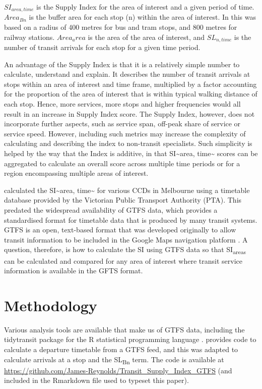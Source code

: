 \documentclass[numbered]{trbunofficial}
\begin{document}
\(SI_{area, time}\) is the Supply Index for the area of interest and a
given period of time. \(Area_{Bn}\) is the buffer area for each stop (n)
within the area of interest. In \citet{currie2007identifying} this was
based on a radius of 400 metres for bus and tram stops, and 800 metres
for railway stations. \(Area_area\) is the area of the area of interest,
and \(SL_{n,time}\) is the number of transit arrivals for each stop for
a given time period.

An advantage of the Supply Index is that it is a relatively simple
number to calculate, understand and explain. It describes the number of
transit arrivals at stops within an area of interest and time frame,
multiplied by a factor accounting for the proportion of the area of
interest that is within typical walking distance of each stop. Hence,
more services, more stops and higher frequencies would all result in an
increase in Supply Index score. The Supply Index, however, does not
incorporate further aspects, such as service span, off-peak share of
service or service speed. However, including such metrics may increase
the complexity of calculating and describing the index to non-transit
specialists. Such simplicity is helped by the way that the Index is
additive, in that SI\textasciitilde area, time\textasciitilde{} scores
can be aggregated to calculate an overall score across multiple time
periods or for a region encompassing multiple areas of interest.

\citet{currie2007identifying} calculated the SI\textasciitilde area,
time\textasciitilde{} for various CCDs in Melbourne using a timetable
database provided by the Victorian Public Transport Authority (PTA).
This predated the widespread availability of GTFS data, which provides a
standardised format for timetable data that is produced by many transit
systems. GTFS is an open, text-based format that was developed
originally to allow transit information to be included in the Google
Maps navigation platform \citep{GTFS}. A question, therefore, is how to
calculate the SI using GTFS data so that SI\textsubscript{areas} can be
calculated and compared for any area of interest where transit service
information is available in the GFTS format.

\hypertarget{methodology}{%
\section{Methodology}\label{methodology}}

Various analysis tools are available that make us of GTFS data,
including the tidytransit package \citep{tidytransit2023} for the R
statistical programming language \citep{R-base}.
\citet{tidytransit_departure_timetable} provides code to calculate a
departure timetable from a GTFS feed, and this was adapted to calculate
arrivals at a stop and the SL\textsubscript{Bn} term. The code is
available at
\url{https://github.com/James-Reynolds/Transit_Supply_Index_GTFS} (and
included in the Rmarkdown file used to typeset this paper).
\end{document}
